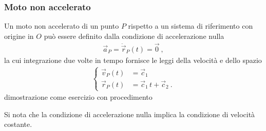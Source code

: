 \documentclass[letterpaper,10pt,italian]{jupyterBook}
\begin{document}
\subsubsection{Moto non accelerato}
\label{\detokenize{ch/mechanics/kinematics-point:moto-non-accelerato}}\label{\detokenize{ch/mechanics/kinematics-point:physics-hs-mechanics-kinematics-point-motion-a-0}}
\sphinxAtStartPar
Un moto non accelerato di un punto \(P\) rispetto a un sistema di riferimento con origine in \(O\) può essere definito dalla condizione di accelerazione nulla
\begin{equation*}
\begin{split}\vec{a}_P = \ddot{\vec{r}}_P(t) = \vec{0} \ ,\end{split}
\end{equation*}
\sphinxAtStartPar
la cui integrazione due volte in tempo fornisce le leggi della velocità e dello spazio
\begin{equation*}
\begin{split}\begin{cases}
  \vec{v}_P(t) & = \vec{c}_1 \\
  \vec{r}_P(t) & = \vec{c}_1 \, t + \vec{c}_2 \ .
\end{cases}\end{split}
\end{equation*}
\sphinxAtStartPar
{} dimostrazione come esercizio con procedimento

\sphinxAtStartPar
Si nota che la condizione di accelerazione nulla implica la condizione di velocità costante. 
\end{document}
